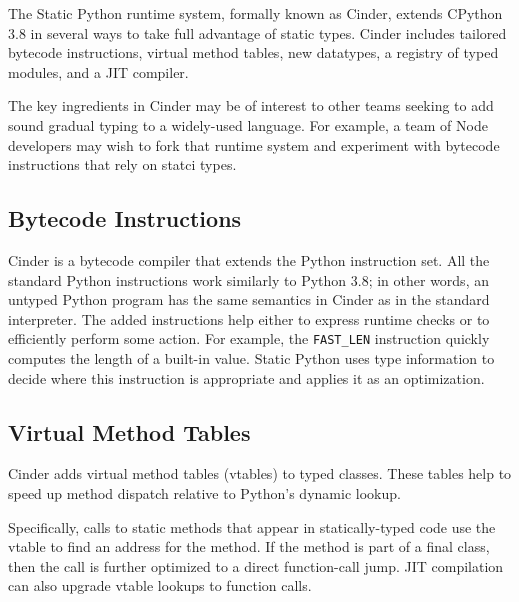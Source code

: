\documentclass[english,cleveref,submission]{programming}
\newcommand{\SP}{Static Python}
\newcommand{\code}[1]{\texttt{#1}}
\begin{document}
The \SP{} runtime system, formally known as Cinder, extends
CPython 3.8 in several ways to take full advantage of static types.
Cinder includes tailored bytecode instructions, virtual method tables, new
datatypes, a registry of typed modules, and a JIT compiler.

The key ingredients in Cinder may be of interest to other teams seeking to add
sound gradual typing to a widely-used language.
For example, a team of Node developers may wish to fork that runtime system
and experiment with bytecode instructions that rely on statci types.


\subsection{Bytecode Instructions}

Cinder is a bytecode compiler that extends the Python instruction set.
All the standard Python instructions work similarly to Python 3.8;
in other words, an untyped Python program has the same semantics in
Cinder as in the standard interpreter.
The added instructions help either to express runtime checks or to
efficiently perform some action.
For example, the \code{FAST\_LEN} instruction quickly computes the
length of a built-in value.
\SP{} uses type information to decide where this instruction is appropriate
and applies it as an optimization.


\subsection{Virtual Method Tables}
\label{s:vtable}

Cinder adds virtual method tables (vtables) to typed classes.
These tables help to speed up method dispatch relative to Python's
dynamic lookup.

Specifically, calls to static methods that appear in statically-typed
code use the vtable to find an address for the method.
If the method is part of a final class, then the call is further optimized
to a direct function-call jump.
JIT compilation can also upgrade vtable lookups to function calls.
\end{document}
